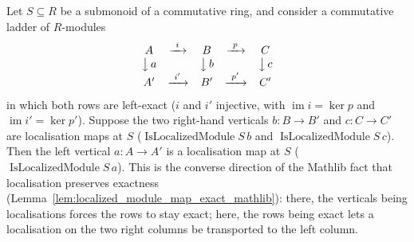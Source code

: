 \begin{lemma}\leanok
  \label{lem:isLocalizedModule_of_exact}
  Let \(S \subseteq R\) be a submonoid of a commutative ring, and consider a commutative ladder of
  \(R\)-modules
  \[
    \begin{array}{ccccc}
      A & \xrightarrow{\ i\ } & B & \xrightarrow{\ p\ } & C \\
      \big\downarrow{\,a} & & \big\downarrow{\,b} & & \big\downarrow{\,c} \\
      A' & \xrightarrow{\ i'\ } & B' & \xrightarrow{\ p'\ } & C'
    \end{array}
  \]
  in which both rows are left-exact (\(i\) and \(i'\) injective, with \(\operatorname{im} i = \ker p\) and
  \(\operatorname{im} i' = \ker p'\)). Suppose the two right-hand verticals \(b : B \to B'\) and
  \(c : C \to C'\) are localisation maps at \(S\) (\(\operatorname{IsLocalizedModule} S\, b\) and
  \(\operatorname{IsLocalizedModule} S\, c\)). Then the left vertical \(a : A \to A'\) is a localisation map
  at \(S\) (\(\operatorname{IsLocalizedModule} S\, a\)). This is the converse direction of the Mathlib fact
  that localisation preserves exactness (Lemma~\ref{lem:localized_module_map_exact_mathlib}): there, the
  verticals being localisations forces the rows to stay exact; here, the rows being exact lets a
  localisation on the two right columns be transported to the left column.
\end{lemma}
